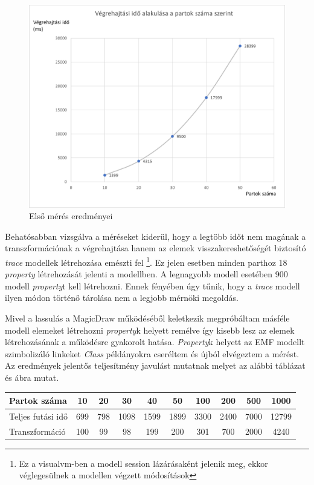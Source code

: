 \begin{figure}[!ht]
	\centering
	\includegraphics[width=12cm, keepaspectratio]{figures/evaluation/mes-1.png}
	\caption{Első mérés eredményei}
	\label{fig:mes1}
\end{figure}

Behatósabban vizsgálva a méréseket kiderül, hogy a legtöbb időt nem magának a transzformációnak a végrehajtása hanem az elemek visszakereshetőségét biztosító \emph{trace} modellek létrehozása emészti fel \footnote{Ez a visualvm-ben a modell session lázárásaként jelenik meg, ekkor véglegesülnek a modellen végzett módosítások}. Ez jelen esetben minden parthoz 18 \emph{property} létrehozását jelenti a modellben. A legnagyobb modell esetében 900 modell \emph{property}t kell létrehozni. Ennek fényében úgy tűnik, hogy a \emph{trace} modell ilyen módon történő tárolása nem a legjobb mérnöki megoldás.



Mivel a lassulás a MagicDraw működéséből keletkezik megpróbáltam másféle modell elemeket létrehozni \emph{property}k helyett remélve így kisebb lesz az elemek létrehozásának a működésre gyakorolt hatása. \emph{Property}k helyett az EMF modellt szimbolizáló linkeket \emph{Class} példányokra cseréltem és újból elvégeztem a mérést. Az eredmények jelentős teljesítmény javulást mutatnak melyet az alábbi táblázat és  ábra mutat.\\

\begin{center}
	\begin{tabular}{ lccccccccc }
		Partok száma & 10 & 20 & 30 & 40 & 50 & 100 & 200 & 500 & 1000 \\
		\hline
		Teljes futási idő & 699 & 798 & 1098 & 1599 & 1899 & 3300 & 2400 & 7000 & 12799 \\
		Transzformáció & 100 & 99 & 98 & 199 & 200 & 301 & 700 & 2000 & 4240\\
	\end{tabular}
\end{center}

